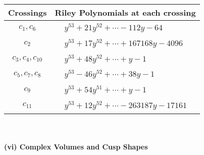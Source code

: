 \documentclass[1p]{elsarticle_modified}
\theoremstyle{definition}
\begin{document}
\begin{tabular}{m{50pt}|m{274pt}}
Crossings & \hspace{64pt}Riley Polynomials at each crossing \\
\hline $$\begin{aligned}c_{1},c_{6}\end{aligned}$$&$\begin{aligned}
&y^{53}+21 y^{52}+\cdots-112 y-64
\end{aligned}$\\
\hline $$\begin{aligned}c_{2}\end{aligned}$$&$\begin{aligned}
&y^{53}+17 y^{52}+\cdots+167168 y-4096
\end{aligned}$\\
\hline $$\begin{aligned}c_{3},c_{4},c_{10}\end{aligned}$$&$\begin{aligned}
&y^{53}+48 y^{52}+\cdots+y-1
\end{aligned}$\\
\hline $$\begin{aligned}c_{5},c_{7},c_{8}\end{aligned}$$&$\begin{aligned}
&y^{53}-46 y^{52}+\cdots+38 y-1
\end{aligned}$\\
\hline $$\begin{aligned}c_{9}\end{aligned}$$&$\begin{aligned}
&y^{53}+54 y^{51}+\cdots+y-1
\end{aligned}$\\
\hline $$\begin{aligned}c_{11}\end{aligned}$$&$\begin{aligned}
&y^{53}+12 y^{52}+\cdots-263187 y-17161
\end{aligned}$\\
\hline
\end{tabular}\\~\\
\newpage\flushleft \textbf{(vi) Complex Volumes and Cusp Shapes}
\end{document}
